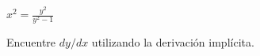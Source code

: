 \item $\displaystyle x^2 = \frac{y^2}{y^2 - 1}$
\par
Encuentre $dy/dx$ utilizando la derivación implícita.
